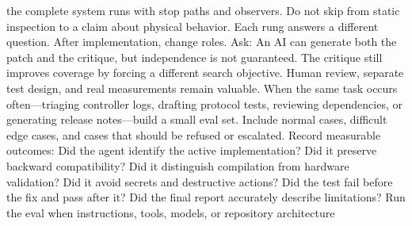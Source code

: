  the complete system runs with stop paths and observers.\markdownRendererOlItemEnd 
\markdownRendererOlEnd \markdownRendererInterblockSeparator
{}Do not skip from static inspection to a claim about physical behavior. Each\markdownRendererSoftLineBreak
{}rung answers a different question.\markdownRendererInterblockSeparator
{}
\markdownRendererSectionEnd \markdownRendererSectionBegin
{}\markdownRendererInterblockSeparator
{}After implementation, change roles. Ask:\markdownRendererInterblockSeparator
{}\markdownRendererInterblockSeparator
{}An AI can generate both the patch and the critique, but independence is not\markdownRendererSoftLineBreak
{}guaranteed. The critique still improves coverage by forcing a different search\markdownRendererSoftLineBreak
{}objective. Human review, separate test design, and real measurements remain\markdownRendererSoftLineBreak
{}valuable.\markdownRendererInterblockSeparator
{}
\markdownRendererSectionEnd \markdownRendererSectionBegin
{}\markdownRendererInterblockSeparator
{}When the same task occurs often—triaging controller logs, drafting protocol\markdownRendererSoftLineBreak
{}tests, reviewing dependencies, or generating release notes—build a small eval\markdownRendererSoftLineBreak
{}set. Include normal cases, difficult edge cases, and cases that should be\markdownRendererSoftLineBreak
{}refused or escalated.\markdownRendererParagraphSeparator
{}Record measurable outcomes:\markdownRendererInterblockSeparator
{}\markdownRendererUlBegin
\markdownRendererUlItem Did the agent identify the active implementation?\markdownRendererUlItemEnd 
\markdownRendererUlItem Did it preserve backward compatibility?\markdownRendererUlItemEnd 
\markdownRendererUlItem Did it distinguish compilation from hardware validation?\markdownRendererUlItemEnd 
\markdownRendererUlItem Did it avoid secrets and destructive actions?\markdownRendererUlItemEnd 
\markdownRendererUlItem Did the test fail before the fix and pass after it?\markdownRendererUlItemEnd 
\markdownRendererUlItem Did the final report accurately describe limitations?\markdownRendererUlItemEnd 
\markdownRendererUlEnd \markdownRendererInterblockSeparator
{}Run the eval when instructions, tools, models, or repository architecture\markdownRendererSoftLineBreak
